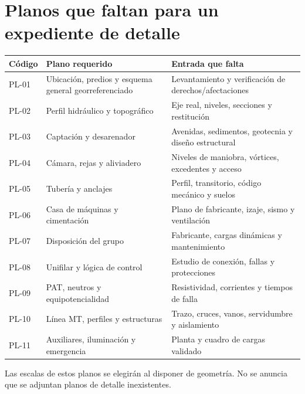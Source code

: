 \section{Planos que faltan para un expediente de detalle}
\begin{longtable}{L{1.5cm}L{5.7cm}L{7.2cm}}
\toprule Código & Plano requerido & Entrada que falta\\\midrule
PL-01 & Ubicación, predios y esquema general georreferenciado & Levantamiento y verificación de derechos/afectaciones\\
PL-02 & Perfil hidráulico y topográfico & Eje real, niveles, secciones y restitución\\
PL-03 & Captación y desarenador & Avenidas, sedimentos, geotecnia y diseño estructural\\
PL-04 & Cámara, rejas y aliviadero & Niveles de maniobra, vórtices, excedentes y acceso\\
PL-05 & Tubería y anclajes & Perfil, transitorio, código mecánico y suelos\\
PL-06 & Casa de máquinas y cimentación & Plano de fabricante, izaje, sismo y ventilación\\
PL-07 & Disposición del grupo & Fabricante, cargas dinámicas y mantenimiento\\
PL-08 & Unifilar y lógica de control & Estudio de conexión, fallas y protecciones\\
PL-09 & PAT, neutros y equipotencialidad & Resistividad, corrientes y tiempos de falla\\
PL-10 & Línea MT, perfiles y estructuras & Trazo, cruces, vanos, servidumbre y aislamiento\\
PL-11 & Auxiliares, iluminación y emergencia & Planta y cuadro de cargas validado\\
\bottomrule
\end{longtable}
Las escalas de estos planos se elegirán al disponer de geometría. No se anuncia que se adjuntan planos de detalle inexistentes.

